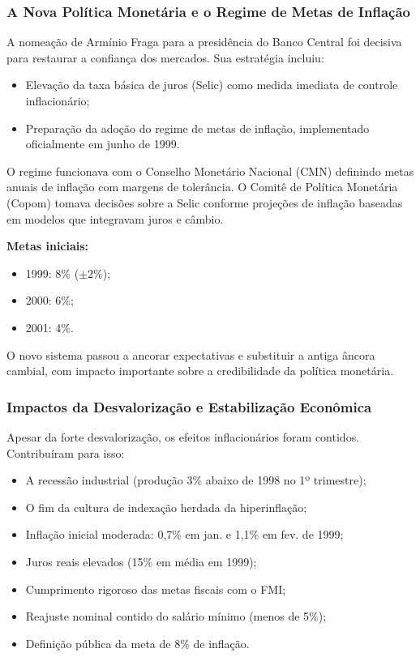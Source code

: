 \documentclass[a4paper,12pt]{article}[abntex2]
\begin{document}
\subsubsection{\textbf{A Nova Política Monetária e o Regime de Metas de Inflação}}

A nomeação de Armínio Fraga para a presidência do Banco Central foi decisiva para restaurar a confiança dos mercados. Sua estratégia incluiu:

\begin{itemize}
    \item Elevação da taxa básica de juros (Selic) como medida imediata de controle inflacionário;
    \item Preparação da adoção do regime de metas de inflação, implementado oficialmente em junho de 1999.
\end{itemize}

O regime funcionava com o Conselho Monetário Nacional (CMN) definindo metas anuais de inflação com margens de tolerância. O Comitê de Política Monetária (Copom) tomava decisões sobre a Selic conforme projeções de inflação baseadas em modelos que integravam juros e câmbio.

\textbf{Metas iniciais:}
\begin{itemize}
    \item 1999: 8\% (\(\pm2\%\));
    \item 2000: 6\%;
    \item 2001: 4\%.
\end{itemize}

O novo sistema passou a ancorar expectativas e substituir a antiga âncora cambial, com impacto importante sobre a credibilidade da política monetária.

\subsubsection{\textbf{Impactos da Desvalorização e Estabilização Econômica}}

Apesar da forte desvalorização, os efeitos inflacionários foram contidos. Contribuíram para isso:

\begin{itemize}
    \item A recessão industrial (produção 3\% abaixo de 1998 no 1º trimestre);
    \item O fim da cultura de indexação herdada da hiperinflação;
    \item Inflação inicial moderada: 0,7\% em jan. e 1,1\% em fev. de 1999;
    \item Juros reais elevados (15\% em média em 1999);
    \item Cumprimento rigoroso das metas fiscais com o FMI;
    \item Reajuste nominal contido do salário mínimo (menos de 5\%);
    \item Definição pública da meta de 8\% de inflação.
\end{itemize}
\end{document}
